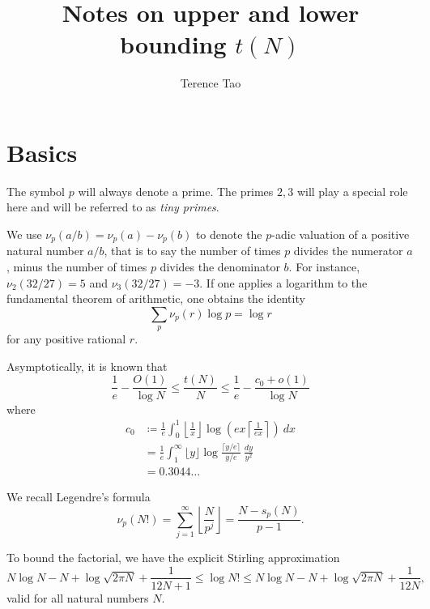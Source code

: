 \documentclass[12pt,a4paper,reqno]{amsart}
\numberwithin{equation}{section}
\theoremstyle{plain}
\theoremstyle{definition}
\begin{document}
\title{Notes on upper and lower bounding $t(N)$}

\author{Terence Tao}
\maketitle


\section{Basics}

The symbol $p$ will always denote a prime.  The primes $2,3$ will play a special role here and will be referred to as \emph{tiny primes}.

We use $\nu_p(a/b) = \nu_p(a)-\nu_p(b)$ to denote the $p$-adic valuation of a positive natural number $a/b$, that is to say the number of times $p$ divides the numerator $a$, minus the number of times $p$ divides the denominator $b$.  For instance, $\nu_2(32/27)=5$ and $\nu_3(32/27)=-3$. 
If one applies a logarithm to the fundamental theorem of arithmetic, one obtains the identity
\begin{equation}\label{ftoa}
  \sum_p \nu_p(r) \log p = \log r
\end{equation}
for any positive rational $r$.

Asymptotically, it is known that
$$ \frac{1}{e} - \frac{O(1)}{\log N} \leq \frac{t(N)}{N} \leq \frac{1}{e} - \frac{c_0+o(1)}{\log N}$$
where
  \begin{align*}
    c_0 &\coloneqq \frac{1}{e} \int_0^1 \left \lfloor \frac{1}{x} \right\rfloor \log \left( ex \left \lceil \frac{1}{ex} \right\rceil \right)\ dx \\
    &= \frac{1}{e} \int_1^\infty \lfloor y \rfloor \log \frac{\lceil y/e \rceil}{y/e}\ \frac{dy}{y^2} \\
    &= 0.3044\dots
  \end{align*}



We recall Legendre's formula
\begin{equation}\label{legendre}
  \nu_p(N!) = \sum_{j=1}^\infty \left\lfloor \frac{N}{p^j} \right\rfloor = \frac{N - s_p(N)}{p-1}.
\end{equation}


To bound the factorial, we have the explicit Stirling approximation \cite{robbins}
\begin{equation}\label{stirling}
  N \log N - N + \log \sqrt{2\pi N} + \frac{1}{12N+1} \leq \log N! \leq N \log N - N + \log \sqrt{2\pi N} + \frac{1}{12N},
\end{equation}
valid for all natural numbers $N$. 
\end{document}
